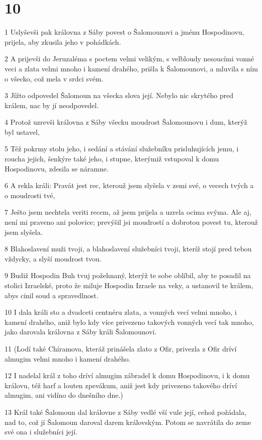 \chapter{10}

\par 1 Uslyševši pak královna z Sáby povest o Šalomounovi a jménu Hospodinovu, prijela, aby zkusila jeho v pohádkách.
\par 2 A prijevši do Jeruzaléma s poctem velmi velikým, s velbloudy nesoucími vonné veci a zlata velmi mnoho i kamení drahého, prišla k Šalomounovi, a mluvila s ním o všecko, což mela v srdci svém.
\par 3 Jížto odpovedel Šalomoun na všecka slova její. Nebylo nic skrytého pred králem, nac by jí neodpovedel.
\par 4 Protož uzrevši královna z Sáby všecku moudrost Šalomounovu i dum, kterýž byl ustavel,
\par 5 Též pokrmy stolu jeho, i sedání a stávání služebníku prisluhujících jemu, i roucha jejich, šenkýre také jeho, i stupne, kterýmiž vstupoval k domu Hospodinovu, zdesila se náramne.
\par 6 A rekla králi: Pravát jest rec, kterouž jsem slyšela v zemi své, o vecech tvých a o moudrosti tvé,
\par 7 Ješto jsem nechtela veriti recem, až jsem prijela a uzrela ocima svýma. Ale aj, není mi praveno ani polovice; prevýšil jsi moudrostí a dobrotou povest tu, kterouž jsem slyšela.
\par 8 Blahoslavení muži tvoji, a blahoslavení služebníci tvoji, kteríž stojí pred tebou vždycky, a slyší moudrost tvou.
\par 9 Budiž Hospodin Buh tvuj požehnaný, kterýž te sobe oblíbil, aby te posadil na stolici Izraelské, proto že miluje Hospodin Izraele na veky, a ustanovil te králem, abys cinil soud a spravedlnost.
\par 10 I dala králi sto a dvadceti centnéru zlata, a vonných vecí velmi mnoho, i kamení drahého, aniž bylo kdy více privezeno takových vonných vecí tak mnoho, jako darovala královna z Sáby králi Šalomounovi.
\par 11 (Lodí také Chíramova, kteráž prinášela zlato z Ofir, privezla z Ofir dríví almugim velmi mnoho i kamení drahého.
\par 12 I nadelal král z toho dríví almugim zábradel k domu Hospodinovu, i k domu královu, též harf a louten zpevákum, aniž jest kdy privezeno takového dríví almugim, ani vidíno do dnešního dne.)
\par 13 Král také Šalomoun dal královne z Sáby vedlé vší vule její, cehož požádala, nad to, což jí Šalomoun daroval darem královským. Potom se navrátila do zeme své ona i služebníci její.
